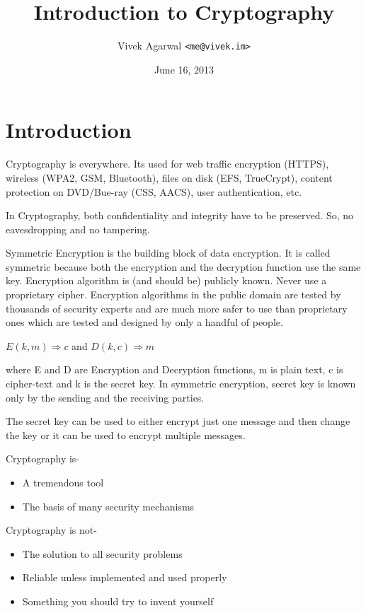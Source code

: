 \documentclass[a4paper, 12pt]{article}
\title{Introduction to Cryptography}
\author{Vivek Agarwal \texttt{<me@vivek.im>}}
\date{June 16, 2013}
\begin{document}
\setlength{\parskip}{10pt plus 1pt minus 1pt}
\maketitle


\section{Introduction}

Cryptography is everywhere. Its used for web traffic encryption (HTTPS), wireless (WPA2, GSM, Bluetooth), files on disk (EFS, TrueCrypt), content protection on DVD/Bue-ray (CSS, AACS), user authentication, etc.

In Cryptography, both confidentiality and integrity have to be preserved. So, no eavesdropping and no tampering.

Symmetric Encryption is the building block of data encryption. It is called symmetric because both the encryption and the decryption function use the same key. Encryption algorithm is (and should be) publicly known. Never use a proprietary cipher. Encryption algorithms in the public domain are tested by thousands of security experts and are much more safer to use than proprietary ones which are tested and designed by only a handful of people.

$E(k, m) \Rightarrow c$ and $D(k, c) \Rightarrow m$

where E and D are Encryption and Decryption functions, m is plain text, c is cipher-text and k is the secret key. In symmetric encryption, secret key is known only by the sending and the receiving parties.

The secret key can be used to either encrypt just one message and then change the key or it can be used to encrypt multiple messages.

\noindent
Cryptography is-

\begin{itemize}
    \item A tremendous tool
    \item The basis of many security mechanisms
\end{itemize}

\noindent
Cryptography is not-

\begin{itemize}
    \item The solution to all security problems
    \item Reliable unless implemented and used properly
    \item Something you should try to invent yourself
\end{itemize}
\end{document}
